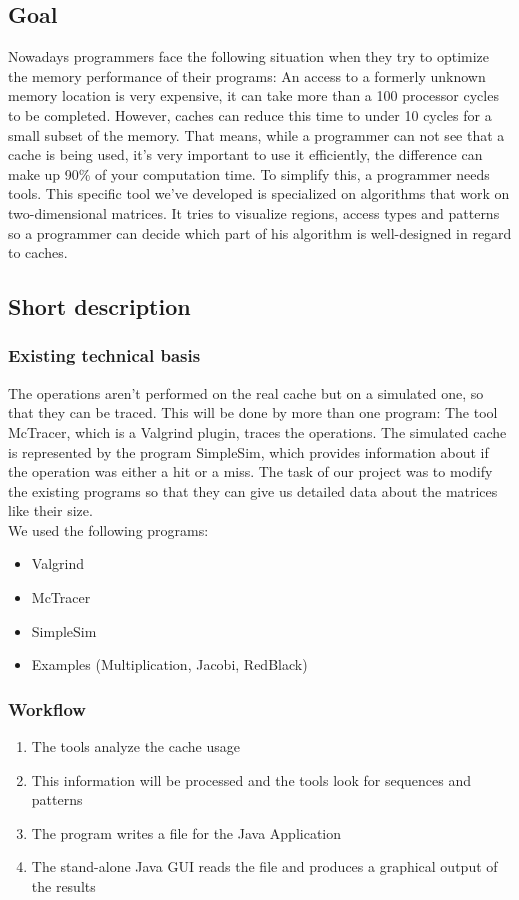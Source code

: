 \subsection{Goal}
Nowadays programmers face the following situation when they try to optimize the memory performance of their programs: An access to a formerly unknown memory location is very expensive, it can take more than a 100 processor cycles to be completed. However, caches can reduce this time to under 10 cycles for a small subset of the memory. That means, while a programmer can not see that a cache is being used, it's very important to use it efficiently, the difference can make up 90\% of your computation time.\newline
To simplify this, a programmer needs tools. This specific tool we've developed is specialized on algorithms that work on two-dimensional matrices. It tries to visualize regions, access types and patterns so a programmer can decide which part of his algorithm is well-designed in regard to caches.

\subsection{Short description}
\subsubsection{Existing technical basis}
The operations aren't performed on the real cache but on a simulated one, so that they can be traced. This will be done by more than one program: The tool McTracer, which is a Valgrind plugin, traces the operations. The simulated cache is represented by the program SimpleSim, which provides information about if the operation was either a hit or a miss. The task of our project was to modify the existing programs so that they can give us detailed data about the matrices like their size.
\\

We used the following programs:
\begin{itemize}
\item Valgrind
\item McTracer
\item SimpleSim
\item Examples (Multiplication, Jacobi, RedBlack)
\end{itemize}

\subsubsection{Workflow}
\begin{enumerate}
\item The tools analyze the cache usage
\item This information will be processed and the tools look for sequences and patterns
\item The program writes a file for the Java Application
\item The stand-alone Java GUI reads the file and produces a graphical output of the results
\end{enumerate}

